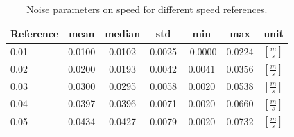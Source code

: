 \documentclass[12pt,a4paper, twoside]{article}
\begin{document}
\begin{table}[H]
	\centering
	\begin{tabular}{l||c|c|c|c|c|r} 
	\textbf{Reference}&\textbf{mean} &\textbf{median} 
	&\textbf{std} & \textbf{min}&\textbf{max}& \textbf{unit}\\ 
	\hline
	\hline 
	0.01&0.0100&0.0102&0.0025&-0.0000&0.0224&$[\frac{m}{s}]$\\\hline
	0.02&0.0200&0.0193&0.0042&0.0041&0.0356&$[\frac{m}{s}]$\\\hline
	0.03&0.0300&0.0295&0.0058&0.0020&0.0538&$[\frac{m}{s}]$\\\hline
	0.04&0.0397&0.0396&0.0071&0.0020&0.0660&$[\frac{m}{s}]$\\\hline
	0.05&0.0434&0.0427&0.0079&0.0020&0.0732&$[\frac{m}{s}]$\\
	\end{tabular} 
	\caption{Noise parameters on speed for different speed references.}
	\label{tab:speed_param}
\end{table}
\end{document}
